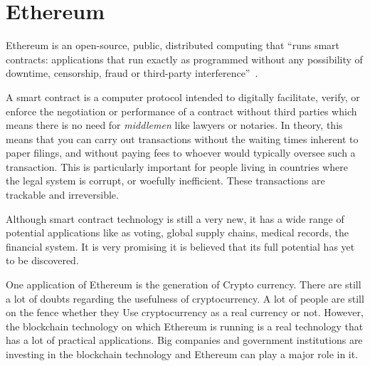 \section{Ethereum}

Ethereum is an open-source, public, distributed computing that ``runs
smart contracts: applications that run exactly as programmed without
any possibility of downtime, censorship, fraud or third-party
interference''~\cite{hid-sp18-506-EthereumOrg}.

A smart contract is a computer protocol intended to digitally
facilitate, verify, or enforce the negotiation or performance of a
contract without third parties which means there is no need for
\emph{middlemen} like lawyers or notaries. In theory, this means that
you can carry out transactions without the waiting times inherent to
paper filings, and without paying fees to whoever would typically
oversee such a transaction.  This is particularly important for people
living in countries where the legal system is corrupt, or woefully
inefficient.  These transactions are trackable and irreversible.

Although smart contract technology is still a very new, it has a wide
range of potential applications like as voting, global supply chains,
medical records, the financial system.  It is very promising it is
believed that its full potential has yet to be discovered.


One application of Ethereum is the generation of Crypto
currency. There are still a lot of doubts regarding the usefulness of
cryptocurrency. A lot of people are still on the fence whether they
Use cryptocurrency as a real currency or not. However, the blockchain
technology on which Ethereum is running is a real technology that has
a lot of practical applications. Big companies and government
institutions are investing in the blockchain technology and Ethereum
can play a major role in it.
